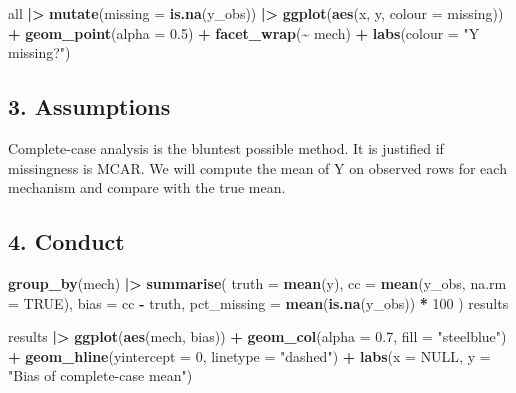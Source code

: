 \documentclass[
]{article}
\newenvironment{Shaded}{\begin{snugshade}}{\end{snugshade}}
\newcommand{\AttributeTok}[1]{\textcolor[rgb]{0.13,0.29,0.53}{#1}}
\newcommand{\ConstantTok}[1]{\textcolor[rgb]{0.56,0.35,0.01}{#1}}
\newcommand{\DecValTok}[1]{\textcolor[rgb]{0.00,0.00,0.81}{#1}}
\newcommand{\FloatTok}[1]{\textcolor[rgb]{0.00,0.00,0.81}{#1}}
\newcommand{\FunctionTok}[1]{\textcolor[rgb]{0.13,0.29,0.53}{\textbf{#1}}}
\newcommand{\NormalTok}[1]{#1}
\newcommand{\SpecialCharTok}[1]{\textcolor[rgb]{0.81,0.36,0.00}{\textbf{#1}}}
\newcommand{\StringTok}[1]{\textcolor[rgb]{0.31,0.60,0.02}{#1}}
\begin{document}
\begin{Shaded}
\begin{Highlighting}[]
\NormalTok{all }\SpecialCharTok{|\textgreater{}}
  \FunctionTok{mutate}\NormalTok{(}\AttributeTok{missing =} \FunctionTok{is.na}\NormalTok{(y\_obs)) }\SpecialCharTok{|\textgreater{}}
  \FunctionTok{ggplot}\NormalTok{(}\FunctionTok{aes}\NormalTok{(x, y, }\AttributeTok{colour =}\NormalTok{ missing)) }\SpecialCharTok{+}
  \FunctionTok{geom\_point}\NormalTok{(}\AttributeTok{alpha =} \FloatTok{0.5}\NormalTok{) }\SpecialCharTok{+}
  \FunctionTok{facet\_wrap}\NormalTok{(}\SpecialCharTok{\textasciitilde{}}\NormalTok{ mech) }\SpecialCharTok{+}
  \FunctionTok{labs}\NormalTok{(}\AttributeTok{colour =} \StringTok{"Y missing?"}\NormalTok{)}
\end{Highlighting}
\end{Shaded}

\subsection{3. Assumptions}\label{assumptions}

Complete-case analysis is the bluntest possible method. It is justified
if missingness is MCAR. We will compute the mean of Y on observed rows
for each mechanism and compare with the true mean.

\subsection{4. Conduct}\label{conduct}

\begin{Shaded}
\begin{Highlighting}[]
  \FunctionTok{group\_by}\NormalTok{(mech) }\SpecialCharTok{|\textgreater{}}
  \FunctionTok{summarise}\NormalTok{(}
    \AttributeTok{truth =} \FunctionTok{mean}\NormalTok{(y),}
    \AttributeTok{cc    =} \FunctionTok{mean}\NormalTok{(y\_obs, }\AttributeTok{na.rm =} \ConstantTok{TRUE}\NormalTok{),}
    \AttributeTok{bias  =}\NormalTok{ cc }\SpecialCharTok{{-}}\NormalTok{ truth,}
    \AttributeTok{pct\_missing =} \FunctionTok{mean}\NormalTok{(}\FunctionTok{is.na}\NormalTok{(y\_obs)) }\SpecialCharTok{*} \DecValTok{100}
\NormalTok{  )}
\NormalTok{results}
\end{Highlighting}
\end{Shaded}

\begin{Shaded}
\begin{Highlighting}[]
\NormalTok{results }\SpecialCharTok{|\textgreater{}}
  \FunctionTok{ggplot}\NormalTok{(}\FunctionTok{aes}\NormalTok{(mech, bias)) }\SpecialCharTok{+}
  \FunctionTok{geom\_col}\NormalTok{(}\AttributeTok{alpha =} \FloatTok{0.7}\NormalTok{, }\AttributeTok{fill =} \StringTok{"steelblue"}\NormalTok{) }\SpecialCharTok{+}
  \FunctionTok{geom\_hline}\NormalTok{(}\AttributeTok{yintercept =} \DecValTok{0}\NormalTok{, }\AttributeTok{linetype =} \StringTok{"dashed"}\NormalTok{) }\SpecialCharTok{+}
  \FunctionTok{labs}\NormalTok{(}\AttributeTok{x =} \ConstantTok{NULL}\NormalTok{, }\AttributeTok{y =} \StringTok{"Bias of complete{-}case mean"}\NormalTok{)}
\end{Highlighting}
\end{Shaded}
\end{document}
